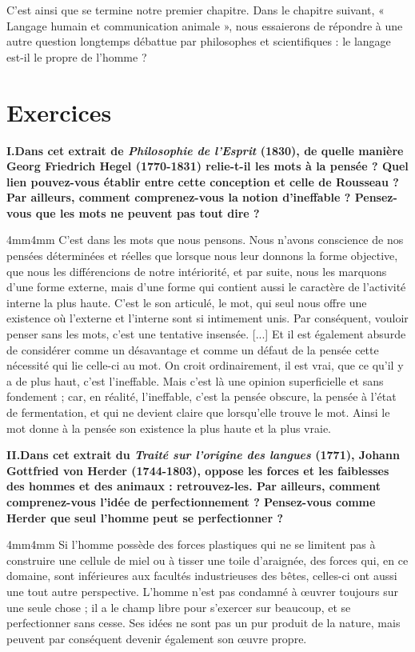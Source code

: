 C’est ainsi que se termine notre premier chapitre. Dans le chapitre suivant, « Langage humain et communication animale », nous essaierons de répondre à une autre question longtemps débattue par philosophes et scientifiques : le langage est-il le propre de l’homme ?
\section*{Exercices}
\noindent\textbf{I.\quad Dans cet extrait de \textit{Philosophie de l’Esprit} (1830), de quelle manière Georg Friedrich Hegel (1770-1831) relie-t-il les mots à la pensée ? Quel lien pouvez-vous établir entre cette conception et celle de Rousseau ? Par ailleurs, comment comprenez-vous la notion d’ineffable ? Pensez-vous que les mots ne peuvent pas tout dire ?}
\begin{adjustwidth}{4mm}{4mm}\small
C’est dans les mots que nous pensons. Nous n’avons conscience de nos pensées déterminées et réelles que lorsque nous leur donnons la forme objective, que nous les différencions de notre intériorité, et par suite, nous les marquons d’une forme externe, mais d’une forme qui contient aussi le caractère de l’activité interne la plus haute. C’est le son articulé, le mot, qui seul nous offre une existence où l’externe et l’interne sont si intimement unis. Par conséquent, vouloir penser sans les mots, c’est une tentative insensée. [...] Et il est également absurde de considérer comme un désavantage et comme un défaut de la pensée cette nécessité qui lie celle-ci au mot. On croit ordinairement, il est vrai, que ce qu’il y a de plus haut, c’est l’ineffable. Mais c’est là une opinion superficielle et sans fondement ; car, en réalité, l’ineffable, c’est la pensée obscure, la pensée à l’état de fermentation, et qui ne devient claire que lorsqu’elle trouve le mot. Ainsi le mot donne à la pensée son existence la plus haute et la plus vraie.
\end{adjustwidth}
\noindent\textbf{II.\quad Dans cet extrait du \textit{Traité sur l’origine des langues} (1771), Johann Gottfried von Herder (1744-1803), oppose les forces et les faiblesses des hommes et des animaux : retrouvez-les. Par ailleurs, comment comprenez-vous l’idée de perfectionnement ? Pensez-vous comme Herder que seul l’homme peut se perfectionner ?}
\begin{adjustwidth}{4mm}{4mm}\small
Si l’homme possède des forces plastiques qui ne se limitent pas à construire une cellule de miel ou à tisser une toile d’araignée, des forces qui, en ce domaine, sont inférieures aux facultés industrieuses des bêtes, celles-ci ont aussi une tout autre perspective. L’homme n’est pas condamné à œuvrer toujours sur une seule chose ; il a le champ libre pour s’exercer sur beaucoup, et se perfectionner sans cesse. Ses idées ne sont pas un pur produit de la nature, mais peuvent par conséquent devenir également son œuvre propre.
\end{adjustwidth}
